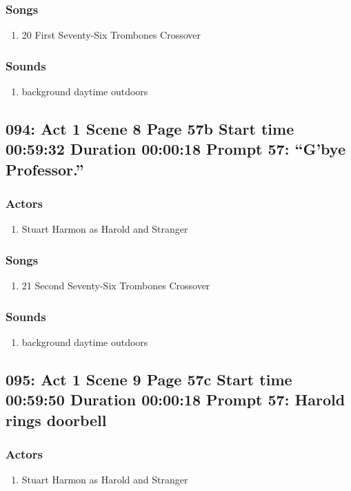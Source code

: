 \subsubsection{Songs}
\begin{enumerate}
\item 20 First Seventy-Six Trombones Crossover
\end{enumerate}\subsubsection{Sounds}
\begin{enumerate}
\item background daytime outdoors
\end{enumerate}
\subsection{094: Act 1 Scene 8 Page 57b Start time 00:59:32 Duration 00:00:18 Prompt 57: ``G'bye Professor.''}

\subsubsection{Actors}
\begin{enumerate}
\item Stuart Harmon as Harold and Stranger
\end{enumerate}

\subsubsection{Songs}
\begin{enumerate}
\item 21 Second Seventy-Six Trombones Crossover
\end{enumerate}\subsubsection{Sounds}
\begin{enumerate}
\item background daytime outdoors
\end{enumerate}
\subsection{095: Act 1 Scene 9 Page 57c Start time 00:59:50 Duration 00:00:18 Prompt 57: Harold rings doorbell}

\subsubsection{Actors}
\begin{enumerate}
\item Stuart Harmon as Harold and Stranger
\end{enumerate}

